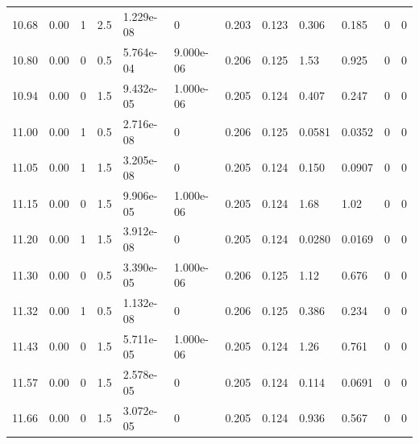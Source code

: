 \documentclass[preview]{standalone}
\begin{document}
{{{\begin{tabular}{L{1.2cm}C{1.2cm} C{0.3cm}C{0.5cm} C{1.4cm}C{1.4cm} C{1.4cm}C{1.4cm} C{1.6cm}C{1.6cm} C{1.6cm}C{1.6cm}}
  10.68  &  0.00  & 1     & 2.5 &  1.229e-08  & 0  &  0.203&   0.123& 0.306 & 0.185   &  0 & 0  \\ 
  10.80  &  0.00  & 0     & 0.5 &  5.764e-04  & 9.000e-06  &  0.206&   0.125& 1.53 & 0.925   &  0 & 0  \\ 
  10.94  &  0.00  & 0     & 1.5 &  9.432e-05  & 1.000e-06  &  0.205&   0.124& 0.407 & 0.247   &  0 & 0  \\ 
  11.00  &  0.00  & 1     & 0.5 &  2.716e-08  & 0  &  0.206&   0.125& 0.0581 & 0.0352   &  0 & 0  \\ 
  11.05  &  0.00  & 1     & 1.5 &  3.205e-08  & 0  &  0.205&   0.124& 0.150 & 0.0907   &  0 & 0  \\ 
  11.15  &  0.00  & 0     & 1.5 &  9.906e-05  & 1.000e-06  &  0.205&   0.124& 1.68 & 1.02   &  0 & 0  \\ 
  11.20  &  0.00  & 1     & 1.5 &  3.912e-08  & 0  &  0.205&   0.124& 0.0280 & 0.0169   &  0 & 0  \\ 
  11.30  &  0.00  & 0     & 0.5 &  3.390e-05  & 1.000e-06  &  0.206&   0.125& 1.12 & 0.676   &  0 & 0  \\ 
  11.32  &  0.00  & 1     & 0.5 &  1.132e-08  & 0  &  0.206&   0.125& 0.386 & 0.234   &  0 & 0  \\ 
  11.43  &  0.00  & 0     & 1.5 &  5.711e-05  & 1.000e-06  &  0.205&   0.124& 1.26 & 0.761   &  0 & 0  \\ 
  11.57  &  0.00  & 0     & 1.5 &  2.578e-05  & 0  &  0.205&   0.124& 0.114 & 0.0691   &  0 & 0  \\ 
  11.66  &  0.00  & 0     & 1.5 &  3.072e-05  & 0  &  0.205&   0.124& 0.936 & 0.567   &  0 & 0  \\ 
\hline 
\end{tabular} 

}}}
\end{document}
